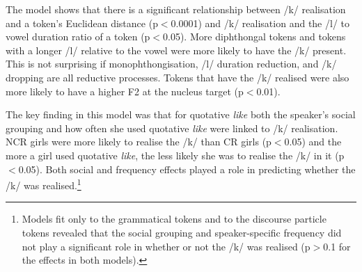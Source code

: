 The model shows that there is a significant relationship between /k/ realisation and a token's Euclidean distance (p$<$0.0001) and /k/ realisation and the /l/ to vowel duration ratio of a token (p$<$0.05).  More diphthongal tokens and tokens with a longer /l/ relative to the vowel were more likely to have the /k/ present.  This is not surprising if monophthongisation, /l/ duration reduction, and /k/ dropping are all reductive processes.  Tokens that have the /k/ realised were also more likely to have a higher F2 at the nucleus target (p$<$0.01).

The key finding in this mo\-del was that for quotative \textit{like} both the spea\-ker's social grouping and how often she used quotative \textit{like} were linked to /k/ realisation.  NCR girls were more likely to realise the /k/ than CR girls (p$<$0.05) and the more a girl used quotative \textit{like}, the less likely she was to realise the /k/ in it (p$<$0.05).  Both social and frequency effects played a role in predicting whether the /k/ was realised.\footnote{Models fit only to the grammatical tokens and to the discourse particle tokens revealed that the social grouping and speaker-specific frequency did not play a significant role in whether or not the /k/ was realised (p$>$0.1 for the effects in both models).}




